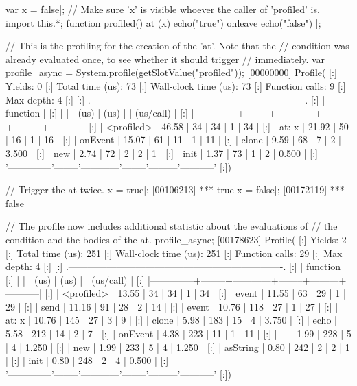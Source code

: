\begin{urbiscript}
var x = false|;
// Make sure 'x' is visible whoever the caller of 'profiled' is.
import this.*;
function profiled()
{
  at (x)
    echo("true")
  onleave
    echo("false")
}|;

// This is the profiling for the creation of the 'at'. Note that the
// condition was already evaluated once, to see whether it should trigger
// immediately.
var profile_async = System.profile(getSlotValue("profiled"));
[00000000] Profile(
[:]  Yields:                    0
[:]  Total time (us):          73
[:]  Wall-clock time (us):     73
[:]  Function calls:            9
[:]  Max depth:                 4
[:]
[:]  .-------------------------------------------------------------------.
[:]  |   function   |   %
[:]  |              |        |    (us)    |  (us)  |         | (us/call) |
[:]  |--------------+--------+------------+--------+---------+-----------|
[:]  |   <profiled> |  46.58 |         34 |     34 |       1 |        34 |
[:]  |    at: { x } |  21.92 |         50 |     16 |       1 |        16 |
[:]  |      onEvent |  15.07 |         61 |     11 |       1 |        11 |
[:]  |        clone |   9.59 |         68 |      7 |       2 |     3.500 |
[:]  |          new |   2.74 |         72 |      2 |       2 |         1 |
[:]  |         init |   1.37 |         73 |      1 |       2 |     0.500 |
[:]  '--------------'--------'------------'--------'---------'-----------'
[:])

// Trigger the at twice.
x = true|;
[00106213] *** true
x = false|;
[00172119] *** false

// The profile now includes additional statistic about the evaluations of
// the condition and the bodies of the at.
profile_async;
[00178623] Profile(
[:]  Yields:                    2
[:]  Total time (us):         251
[:]  Wall-clock time (us):    251
[:]  Function calls:           29
[:]  Max depth:                 4
[:]
[:]  .-------------------------------------------------------------------.
[:]  |   function   |   %
[:]  |              |        |    (us)    |  (us)  |         | (us/call) |
[:]  |--------------+--------+------------+--------+---------+-----------|
[:]  |   <profiled> |  13.55 |         34 |     34 |       1 |        34 |
[:]  |        event |  11.55 |         63 |     29 |       1 |        29 |
[:]  |         send |  11.16 |         91 |     28 |       2 |        14 |
[:]  |        event |  10.76 |        118 |     27 |       1 |        27 |
[:]  |    at: { x } |  10.76 |        145 |     27 |       3 |         9 |
[:]  |        clone |   5.98 |        183 |     15 |       4 |     3.750 |
[:]  |         echo |   5.58 |        212 |     14 |       2 |         7 |
[:]  |      onEvent |   4.38 |        223 |     11 |       1 |        11 |
[:]  |            + |   1.99 |        228 |      5 |       4 |     1.250 |
[:]  |          new |   1.99 |        233 |      5 |       4 |     1.250 |
[:]  |     asString |   0.80 |        242 |      2 |       2 |         1 |
[:]  |         init |   0.80 |        248 |      2 |       4 |     0.500 |
[:]  '--------------'--------'------------'--------'---------'-----------'
[:])
\end{urbiscript}

